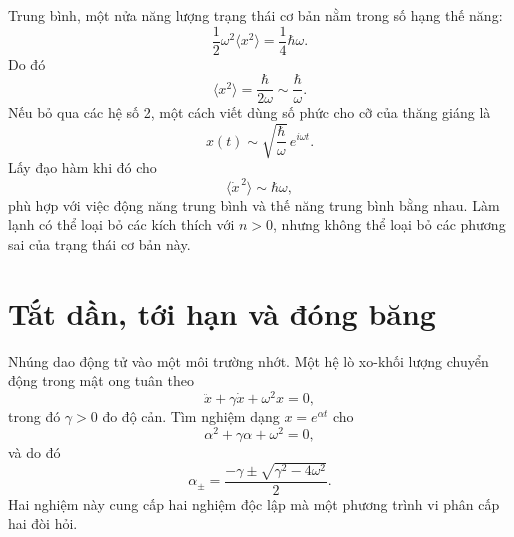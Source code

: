 Trung bình, một nửa năng lượng trạng thái cơ bản nằm trong số hạng thế năng:
\[
\frac12\omega^2\langle x^2\rangle
=\frac14\hbar\omega.
\]
Do đó
\begin{equation}
\langle x^2\rangle=\frac{\hbar}{2\omega}
\sim\frac{\hbar}{\omega}.
\label{eq:c10-zero-point-position}
\end{equation}
Nếu bỏ qua các hệ số 2, một cách viết dùng số phức cho cỡ của thăng giáng là
\[
x(t)\sim\sqrt{\frac{\hbar}{\omega}}\,e^{i\omega t}.
\]
Lấy đạo hàm khi đó cho
\begin{equation}
\langle\dot x^{\,2}\rangle\sim\hbar\omega,
\label{eq:c10-zero-point-velocity}
\end{equation}
phù hợp với việc động năng trung bình và thế năng trung bình bằng nhau. Làm lạnh có thể loại bỏ các kích thích với \(n>0\), nhưng không thể loại bỏ các phương sai của trạng thái cơ bản này.

\section{Tắt dần, tới hạn và đóng băng}

Nhúng dao động tử vào một môi trường nhớt. Một hệ lò xo-khối lượng chuyển động trong mật ong tuân theo
\begin{equation}
\ddot x+\gamma\dot x+\omega^2x=0,
\label{eq:c10-damped}
\end{equation}
trong đó \(\gamma>0\) đo độ cản. Tìm nghiệm dạng \(x=e^{\alpha t}\) cho
\begin{equation}
\alpha^2+\gamma\alpha+\omega^2=0,
\end{equation}
và do đó
\begin{equation}
\alpha_\pm
=\frac{-\gamma\pm\sqrt{\gamma^2-4\omega^2}}{2}.
\label{eq:c10-damped-roots}
\end{equation}
Hai nghiệm này cung cấp hai nghiệm độc lập mà một phương trình vi phân cấp hai đòi hỏi.

\begin{classroomqa}
\end{classroomqa}

